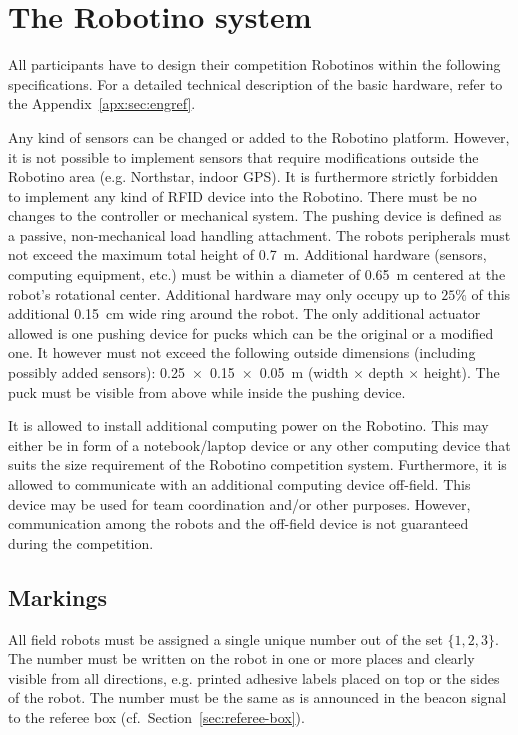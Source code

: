 \documentclass[12pt,twoside]{article}
\newcommand{\Robotino}{Robotino}
\newcommand{\refsec}[1]{Section~\ref{#1}}
\begin{document}
\section{The Robotino system} \label{sec:robotino}

All participants have to design their competition Robotinos within the
following specifications. For a detailed technical description of the
basic hardware, refer to the Appendix~\ref{apx:sec:engref}.

Any kind of sensors can be changed or added to the Robotino platform.
However, it is not possible to implement sensors that require
modifications outside the Robotino area (e.g. Northstar, indoor GPS).
It is furthermore strictly forbidden to implement any kind of RFID
device into the Robotino. There must be no changes to the controller
or mechanical system. The pushing device is defined as a passive,
non-mechanical load handling attachment. The robots peripherals must
not exceed the maximum total height of \SI{0.7}{\metre}. Additional
hardware (sensors, computing equipment, etc.) must be within a
diameter of \SI{0.65}{\metre} centered at the robot's rotational
center. Additional hardware may only occupy up to $25\%$ of this
additional \SI{0.15}{\centi\metre} wide ring around the robot.  The
only additional actuator allowed is one pushing device for pucks which
can be the original or a modified one. It however must not exceed the
following outside dimensions (including possibly added sensors):
\SI{0.25 x 0.15 x 0.05}{\metre} (width $\times$ depth $\times$
height). The puck must be visible from above while inside the pushing
device.

It is allowed to install additional computing power on the
\Robotino. This may either be in form of a notebook/laptop device or
any other computing device that suits the size requirement of the
\Robotino{} competition system. Furthermore, it is allowed to
communicate with an additional computing device off-field. This device
may be used for team coordination and/or other purposes. However,
communication among the robots and the off-field device is not
guaranteed during the competition.

\subsection{Markings}
\label{sec:robot-markings}
All field robots must be assigned a single unique number out of the
set $\{1, 2, 3\}$. The number must be written on the robot in one or
more places and clearly visible from all directions, e.g. printed
adhesive labels placed on top or the sides of the robot. The number
must be the same as is announced in the beacon signal to the referee
box (cf.~\refsec{sec:referee-box}).
\end{document}
